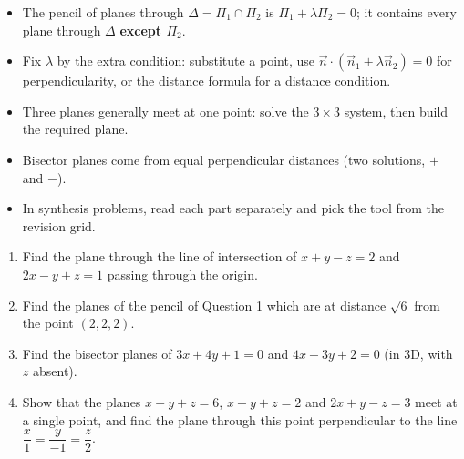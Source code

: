 \documentclass[11pt]{article}
\begin{document}
\begin{aretenir}
\begin{itemize}
\item The pencil of planes through $\Delta=\Pi_1\cap\Pi_2$ is $\Pi_1+\lambda\Pi_2=0$; it contains every plane through $\Delta$ \textbf{except $\Pi_2$}.
\item Fix $\lambda$ by the extra condition: substitute a point, use $\vec n\cdot(\vec n_1+\lambda\vec n_2)=0$ for perpendicularity, or the distance formula for a distance condition.
\item Three planes generally meet at one point: solve the $3\times3$ system, then build the required plane.
\item Bisector planes come from equal perpendicular distances (two solutions, $+$ and $-$).
\item In synthesis problems, read each part separately and pick the tool from the revision grid.
\end{itemize}
\end{aretenir}

\begin{exercice}[Practice]
\begin{enumerate}
\item Find the plane through the line of intersection of $x+y-z=2$ and $2x-y+z=1$ passing through the origin.
\item Find the planes of the pencil of Question 1 which are at distance $\sqrt{6}$ from the point $(2,2,2)$.
\item Find the bisector planes of $3x+4y+1=0$ and $4x-3y+2=0$ (in 3D, with $z$ absent).
\item Show that the planes $x+y+z=6$, $x-y+z=2$ and $2x+y-z=3$ meet at a single point, and find the plane through this point perpendicular to the line $\dfrac{x}{1}=\dfrac{y}{-1}=\dfrac{z}{2}$.
\end{enumerate}
\end{exercice}
\end{document}
